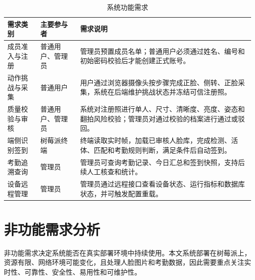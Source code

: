 \begin{table}[H]
    \centering
    \caption{系统功能需求}
    \label{tab:functional_requirements}
    \begin{tabularx}{\textwidth}{p{3.1cm}p{3.1cm}X}
        \toprule
        \textbf{需求类别} & \textbf{主要参与者} & \textbf{需求说明} \\
        \midrule
        成员准入与注册 & 普通用户、管理员 & 管理员预置成员名单；普通用户必须通过姓名、编号和初始密码校验后才能创建正式账号。 \\
        动作挑战与采集 & 普通用户 & 用户通过浏览器摄像头按步骤完成正脸、侧转、正脸采集，系统在后端维护挑战状态并冻结可信注册照。 \\
        质量校验与审核 & 普通用户、管理员 & 系统对注册照进行单人、尺寸、清晰度、亮度、姿态和翻拍风险校验；管理员对通过校验的档案进行通过或驳回。 \\
        端侧识别签到 & 树莓派终端 & 终端读取实时帧，加载已审核人脸库，完成检测、活体、匹配和考勤规则判断，满足条件后自动签到。 \\
        考勤追溯查询 & 管理员 & 管理员可查询考勤记录、今日汇总和签到快照，支持后续人工核查和统计。 \\
        设备远程管理 & 管理员 & 管理员通过远程接口查看设备状态、运行指标和数据库状态，并可触发配置重载。 \\
        \bottomrule
    \end{tabularx}
\end{table}

\section{非功能需求分析}

非功能需求决定系统能否在真实部署环境中持续使用。本文系统部署在树莓派上，资源有限、网络环境可能变化，且处理人脸图片和考勤数据，因此需要重点关注实时性、可靠性、安全性、易用性和可维护性。


